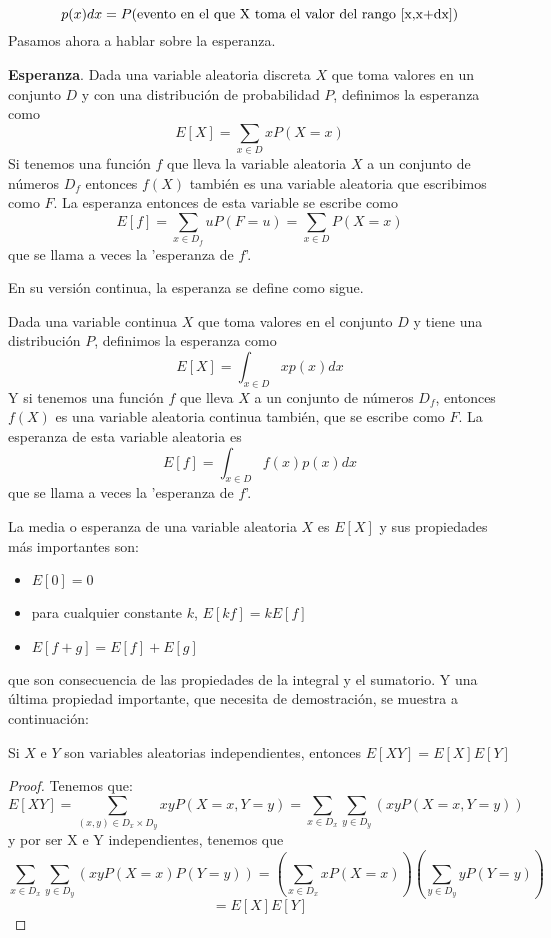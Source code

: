 \[ p(x)dx=P(\textnormal{evento en el que X toma el valor del rango [x,x+dx]}) \]
\cite{forsyth2018probability}
Pasamos ahora a hablar sobre la esperanza.
\begin{definicion}
\textbf{Esperanza}. Dada una variable aleatoria discreta $X$ que toma valores en un conjunto $D$ y con una distribución de probabilidad $P$, definimos la esperanza como
\[ E[X]=\sum_{x \in D} xP(X=x) \]
Si tenemos una función $f$ que lleva la variable aleatoria $X$ a un conjunto de números $D_{f}$ entonces $f(X)$ también es una variable aleatoria que escribimos como $F$. La esperanza entonces de esta variable se escribe como
\[ E[f]=\sum_{x \in D_{f}} uP(F=u)=\sum_{x \in D}P(X=x) \]
que se llama a veces la 'esperanza de $f$'.
\end{definicion}
En su versión continua, la esperanza se define como sigue.
\begin{definicion}
Dada una variable continua $X$ que toma valores en el conjunto $D$ y tiene una distribución $P$, definimos la esperanza como
\[ E[X]=\int_{x \in D} xp(x)dx \]
Y si tenemos una función $f$ que lleva $X$ a un conjunto de números $D_{f}$, entonces $f(X)$ es una variable aleatoria continua también, que se escribe como $F$. La esperanza de esta variable aleatoria es 
\[ E[f]=\int_{x \in D} f(x)p(x)dx \]
que se llama a veces la 'esperanza de $f$'.
\end{definicion}
La media o esperanza de una variable aleatoria $X$ es $E[X]$ y sus propiedades más importantes son:
\begin{itemize}
 \item $E[0]=0$
 \item para cualquier constante $k$, $E[kf]=kE[f]$
 \item $E[f+g]=E[f]+E[g]$
\end{itemize}
que son consecuencia de las propiedades de la integral y el sumatorio. Y una última propiedad importante, que necesita de demostración, se muestra a continuación:
\begin{proposicion}
Si $X$ e $Y$ son variables aleatorias independientes, entonces $E[XY]=E[X]E[Y]$
\end{proposicion}
\begin{proof}
Tenemos que:
\[ E[XY]=\sum_{(x,y) \in D_{x} \times D_{y}} xyP(X=x,Y=y) = \sum_{x \in D_{x}} \sum_{y \in D_{y}} (xyP(X=x,Y=y)) \]
y por ser X e Y independientes, tenemos que
\[ \sum_{x \in D_{x}} \sum_{y \in D_{y}} (xyP(X=x)P(Y=y)) = \left( \sum_{x \in D_{x}} xP(X=x) \right) \left( \sum_{y \in D_{y}} yP(Y=y) \right) \]
\[ =E[X]E[Y] \]
\end{proof}
